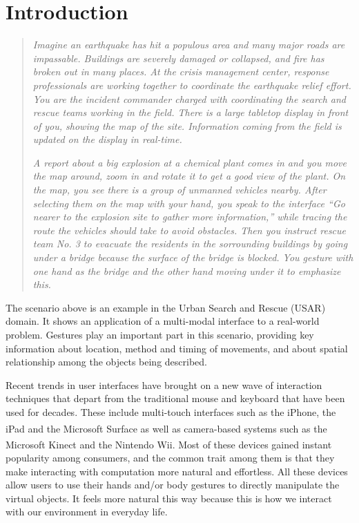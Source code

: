 \section{Introduction}
\begin{quotation}
\textit{Imagine an earthquake has hit a populous area and many major roads are
impassable. Buildings are severely damaged or collapsed, and fire has broken out
in many places. At the crisis management center, response professionals are
working together to coordinate the earthquake relief effort. You are the
incident commander charged with coordinating the search
and rescue teams working in the field. There is a large tabletop display in
front of you, showing the map of the site. Information coming from the field is
updated on the display in real-time.}

\textit{A report about a big explosion at a chemical plant comes in and you move
the map around, zoom in and rotate it to get a good view of the plant. On the
map, you see there is a group of unmanned vehicles nearby. After selecting them
on the map with your hand, you speak to the interface ``Go nearer to the
explosion site to gather more information,'' while tracing the route the
vehicles should take to avoid obstacles. Then you instruct rescue team No. 3 to evacuate the residents
in the sorrounding buildings by going under a bridge because the surface of the
bridge is blocked. You gesture with one hand as the bridge and the other
hand moving under it to emphasize this.}
\end{quotation}

The scenario above is an example in the Urban Search and Rescue (USAR) domain.
It shows an application of a multi-modal interface to a real-world problem. Gestures play an important part in this scenario,
providing key information about location, method and timing of movements,
and about spatial relationship among the objects being described.

Recent trends in user interfaces have brought on a new wave of interaction
techniques that depart from the traditional mouse and keyboard that have been 
used for decades. These include multi-touch interfaces such as the 
iPhone, the iPad and the Microsoft 
Surface\textsuperscript{\textregistered} as well as camera-based systems such as
the Microsoft Kinect and the Nintendo\textsuperscript{\textregistered} Wii. Most
of these devices gained instant popularity among consumers, and the common trait
among them is that they make interacting with computation more natural and 
effortless. All these devices allow users to use their hands and/or body 
gestures to directly manipulate the virtual objects. It feels more natural this 
way because this is how we interact with our environment in everyday life.
 

